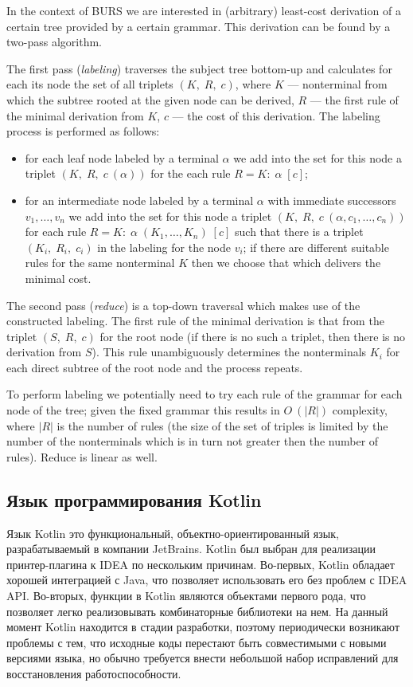 In the context of BURS we are interested in (arbitrary) least-cost derivation of a certain tree provided by 
a certain grammar. This derivation can be found by a two-pass algorithm. 

The first pass (\emph{labeling}) traverses the subject tree bottom-up and calculates for each its node
the set of all triplets $(K,\;R,\;c)$, where $K$ --- nonterminal from which the subtree rooted at the given node
can be derived, $R$ --- the first rule of the minimal derivation from $K$, $c$ --- the cost of this derivation.
The labeling process is performed as follows:

\begin{itemize}
\item for each leaf node labeled by a terminal $\alpha$ we add into the set for this node a 
triplet $(K,\;R,\;c\:(\alpha))$ for the each rule $R=K:\;\alpha\;[c]$;
\item for an intermediate node labeled by a terminal $\alpha$ with immediate successors $v_1,\dots,v_n$ we
add into the set for this node a triplet $(K,\;R,\;c\:(\alpha,c_1,\dots,c_n))$ for each rule 
$R=K:\;\alpha\;(K_1,\dots,K_n)\;[c]$ such that there is a triplet $(K_i,\;R_i,\;c_i)$ in the labeling for
the node $v_i$; if there are different suitable rules for the same nonterminal $K$ then we choose that 
which delivers the minimal cost.
\end{itemize}

The second pass (\emph{reduce}) is a top-down traversal which makes use of the constructed labeling. The first
rule of the minimal derivation is that from the triplet $(S,\;R,\;c)$ for the root node (if there is no such a
triplet, then there is no derivation from $S$). This rule unambiguously determines the nonterminals $K_i$ for 
each direct subtree of the root node and the process repeats.

To perform labeling we potentially need to try each rule of the grammar for each node of the tree; given 
the fixed grammar this results in $O\:(|R|)$ complexity, where $|R|$ is the number of rules  
(the size of the set of triples is limited by the number of the nonterminals which is in turn not 
greater then the number of rules). Reduce is linear as well.

\subsection{Язык программирования Kotlin}

Язык Kotlin это функциональный, объектно-ориентированный язык,
разрабатываемый в компании JetBrains.
Kotlin был выбран для реализации принтер-плагина к IDEA по нескольким причинам. 
Во-первых, Kotlin обладает хорошей интеграцией с Java, что позволяет
использовать его без проблем с IDEA API. 
Во-вторых, функции в Kotlin являются объектами первого рода, что позволяет
легко реализовывать комбинаторные библиотеки на нем.
На данный момент Kotlin находится в стадии разработки, поэтому
периодически возникают
проблемы с тем, что исходные коды перестают быть совместимыми с новыми
версиями языка,
но обычно требуется внести небольшой набор исправлений для
восстановления работоспособности.
